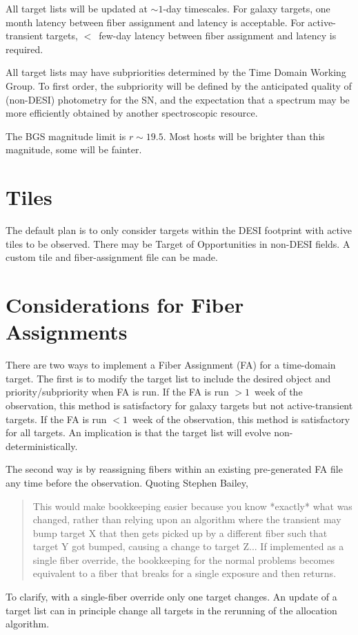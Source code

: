 \documentclass[11pt]{article}   	%
\begin{document}
All target lists will be updated at $\sim 1$-day timescales.  For galaxy targets, one month latency between fiber assignment and latency is acceptable.
 For active-transient targets, $<$~few-day latency between fiber assignment and latency is required.

All target lists may have subpriorities determined by the Time Domain Working Group.  To first order, the subpriority will be defined by the
anticipated quality of (non-DESI)  photometry for the SN, and the expectation that a spectrum may be more efficiently obtained by another
spectroscopic resource.

The BGS magnitude limit is $r \sim 19.5$.  Most hosts will be brighter than this magnitude, some will be fainter.

\section{Tiles}
The default plan is to only consider targets within the DESI footprint with active tiles to be observed.  There may be Target
of Opportunities in non-DESI fields.  A custom tile and fiber-assignment file can be made.

\section{Considerations for Fiber Assignments}

There are two ways to implement a Fiber Assignment (FA) for a time-domain target.  The first is to modify the target list to include 
the desired object and priority/subpriority when FA is run.   If the FA is run $> 1$~week of the observation, this method
is satisfactory for galaxy targets but not active-transient targets.  If the FA is run $<1$~week of the observation, this method is 
satisfactory for all targets.  An implication is that the target list will evolve non-deterministically.

The second way is by reassigning fibers within an existing pre-generated FA file any time before the observation.
Quoting Stephen Bailey,
\begin{quote}
This would make bookkeeping easier because you know *exactly* what was changed, rather than relying upon an algorithm where the transient may bump target X that then gets picked up by a different fiber such that target Y got bumped, causing a change to target Z...  If implemented as a single fiber override, the bookkeeping for the normal problems becomes equivalent to a fiber that breaks for a single exposure and then returns.
\end{quote}
To clarify, with a single-fiber override only one target changes.  An update of a target list can in principle change all targets in the rerunning of the allocation algorithm. 
\end{document}
